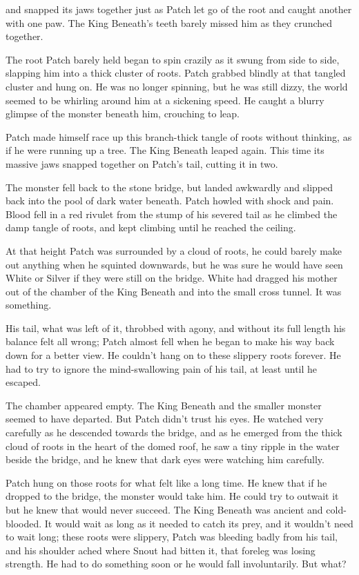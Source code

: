\documentclass[11pt]{article}
\begin{document}
 and snapped its jaws together just as Patch let go of the root and caught another with one paw. The King Beneath's teeth barely missed him as they crunched together.\par
The root Patch barely held began to spin crazily as it swung from side to side, slapping him into a thick cluster of roots. Patch grabbed blindly at that tangled cluster and hung on. He was no longer spinning, but he was still dizzy, the world seemed to be whirling around him at a sickening speed. He caught a blurry glimpse of the monster beneath him, crouching to leap.\par
Patch made himself race up this branch-thick tangle of roots without thinking, as if he were running up a tree. The King Beneath leaped again. This time its massive jaws snapped together on Patch's tail, cutting it in two.\par
The monster fell back to the stone bridge, but landed awkwardly and slipped back into the pool of dark water beneath. Patch howled with shock and pain. Blood fell in a red rivulet from the stump of his severed tail as he climbed the damp tangle of roots, and kept climbing until he reached the ceiling.\par
At that height Patch was surrounded by a cloud of roots, he could barely make out anything when he squinted downwards, but he was sure he would have seen White or Silver if they were still on the bridge. White had dragged his mother out of the chamber of the King Beneath and into the small cross tunnel. It was something. \par
 His tail, what was left of it, throbbed with agony, and without its full length his balance felt all wrong; Patch almost fell when he began to make his way back down for a better view. He couldn't hang on to these slippery roots forever. He had to try to ignore the mind-swallowing pain of his tail, at least until he escaped.\par
The chamber appeared empty. The King Beneath and the smaller monster seemed to have departed. But Patch didn't trust his eyes. He watched very carefully as he descended towards the bridge, and as he emerged from the thick cloud of roots in the heart of the domed roof, he saw a tiny ripple in the water beside the bridge, and he knew that dark eyes were watching him carefully.\par
 Patch hung on those roots for what felt like a long time. He knew that if he dropped to the bridge, the monster would take him. He could try to outwait it %
 but he knew that would never succeed. The King Beneath was ancient and cold-blooded. It would wait as long as it needed to catch its prey, and it wouldn't need to wait long; these roots were slippery, Patch was bleeding badly from his tail, and his shoulder ached where Snout had bitten it, that foreleg was losing strength. He had to do something soon or he would fall involuntarily. But what?\par
\end{document}
